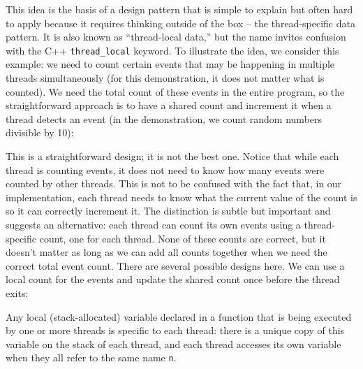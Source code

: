 This idea is the basis of a design pattern that is simple to explain but often hard to apply because it requires thinking outside of the box -- the thread-specific data pattern. It is also known as ``thread-local data,'' but the name invites confusion with the C++ \texttt{thread\_local} keyword. To illustrate the idea, we consider this example: we need to count certain events that may be happening in multiple threads simultaneously (for this demonstration, it does not matter what is counted). We need the total count of these events in the entire program, so the straightforward approach is to have a shared count and increment it when a thread detects an event (in the demonstration, we count random numbers divisible by 10):


This is a straightforward design; it is not the best one. Notice that while each thread is counting events, it does not need to know how many events were counted by other threads. This is not to be confused with the fact that, in our implementation, each thread needs to know what the current value of the count is so it can correctly increment it. The distinction is subtle but important and suggests an alternative: each thread can count its own events using a thread-specific count, one for each thread. None of these counts are correct, but it doesn't matter as long as we can add all counts together when we need the correct total event count. There are several possible designs here. We can use a local count for the events and update the shared count once before the thread exits:


Any local (stack-allocated) variable declared in a function that is being executed by one or more threads is specific to each thread: there is a unique copy of this variable on the stack of each thread, and each thread accesses its own variable when they all refer to the same name \texttt{n}.


